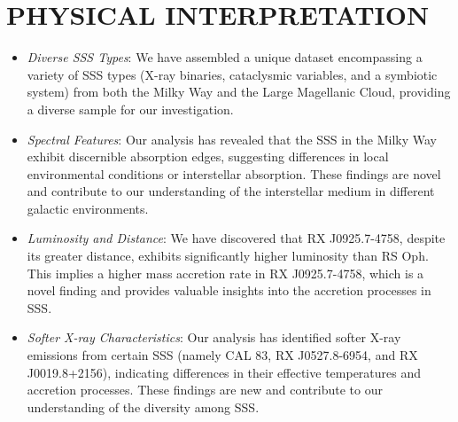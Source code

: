     \section{\MakeUppercase{Physical Interpretation}}
    \begin{itemize}
    	\item \textit{Diverse SSS Types}: We have assembled a unique dataset encompassing a variety of SSS types (X-ray binaries, cataclysmic variables, and a symbiotic system) from both the Milky Way and the Large Magellanic Cloud, providing a diverse sample for our investigation.
    	
    	\item \textit{Spectral Features}: Our analysis has revealed that the SSS in the Milky Way exhibit discernible absorption edges, suggesting differences in local environmental conditions or interstellar absorption. These findings are novel and contribute to our understanding of the interstellar medium in different galactic environments.
    	
    	\item \textit{Luminosity and Distance}: We have discovered that RX J0925.7-4758, despite its greater distance, exhibits significantly higher luminosity than RS Oph. This implies a higher mass accretion rate in RX J0925.7-4758, which is a novel finding and provides valuable insights into the accretion processes in SSS.
    	
    	\item \textit{Softer X-ray Characteristics}: Our analysis has identified softer X-ray emissions from certain SSS (namely CAL 83, RX J0527.8-6954, and RX J0019.8+2156), indicating differences in their effective temperatures and accretion processes. These findings are new and contribute to our understanding of the diversity among SSS.
    	

\end{itemize}
